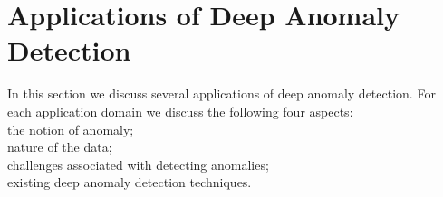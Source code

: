 \section{Applications of Deep Anomaly Detection}
\label{sec:applicationsOfDLAD}

In this section we discuss several applications of deep anomaly detection. For each application
domain we discuss the following four aspects:\\
\textemdash the notion of anomaly;\\
\textemdash nature of the data;\\
\textemdash challenges associated with detecting anomalies;\\
\textemdash existing deep anomaly detection techniques.\\


\label{sec:intrusionDetect}


\label{sec:fraudDetection}


\label{sec:malwareDetection}


\label{sec:medicalAnomalyDetect}



\label{sec:socialNetworks}



\label{sec:logAnomaly}



\label{sec:iotBigDataAnomaly}


\label{sec:industrialDamageDetect}


\label{sec:sensorNetworkAnomaly}



\label{sec:videoSurvelliance}











